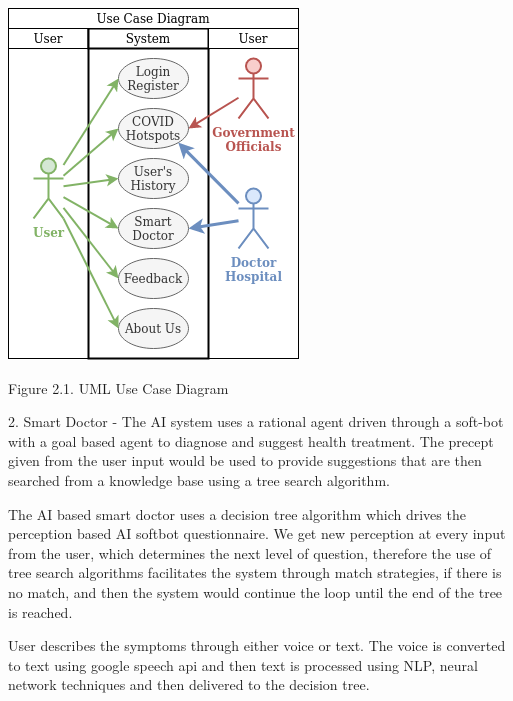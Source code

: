\documentclass[10pt,twocolumn,letterpaper]{article}
\begin{document}
\begin{center}
\includegraphics[width=1\linewidth]{uml_use_case_diagram.png}
\caption{Figure 2.1. UML Use Case Diagram}
\end{center}


2. Smart Doctor - The AI system uses a rational agent driven through a soft-bot with a goal based agent to diagnose and suggest health treatment. The precept given from the user input would be used to provide suggestions that are then searched from a knowledge base using a tree search algorithm.~\cite{smart-doctor}


The AI based smart doctor uses a decision tree algorithm which drives the perception based AI softbot questionnaire. We get new perception at every input from the user, which determines the next level of question, therefore the use of tree search algorithms facilitates the system through match strategies, if there is no match, and then the system would continue the loop until the end of the tree is reached.~\cite{smart-doctor}


User describes the symptoms through either voice or text. The voice is converted to text using google speech api and then text is processed using NLP, neural network techniques and then delivered to the decision tree.
\end{document}
